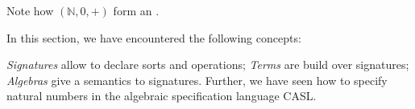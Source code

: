 \documentclass[landscape, slides, light]{mmiss}
\newcommand{\Nat}{\mbox{$\mathbb N$}} %
\begin{document}
\begin{Package}
\begin{Section}[Label=IntroAlgSpec, Title={Signatures, Terms and Algebras}]
\begin{Paragraph}[Label=Example, Title=A Simple Example]
Note how $(\Nat, 0, +)$ form an .
\end{Paragraph}

\begin{Summary}[Label=Summary, Title=Summing Up]
In this section, we have encountered the following concepts:
\begin{List}[Label=Concepts, ListType=itemize]
\ListItem
\emph{Signatures} allow to declare sorts and operations;
\ListItem
\emph{Terms} are build over signatures;
\ListItem
\emph{Algebras} give a semantics to signatures.
\ListItem
Further, we have seen how to specify natural numbers in the algebraic
specification language CASL.
\end{List}
\end{Summary}
\end{Section}
\end{Package}
\end{document}
